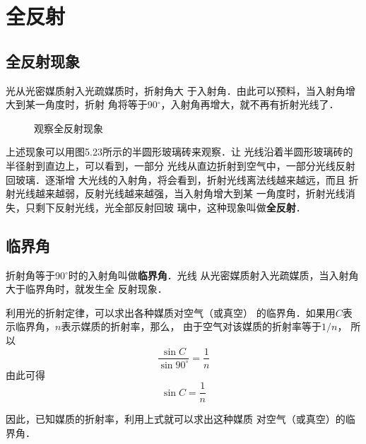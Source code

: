\section{全反射}
\subsection{全反射现象}

光从光密媒质射入光疏媒质时，折射角大
于入射角．由此可以预料，当入射角增大到某一角度时，折射
角将等于90$^\circ$，入射角再增大，就不再有折射光线了．
    \begin{figure}[htp]
        \centering
        \caption{观察全反射现象}
    \end{figure}

上述现象可以用图5.23所示的半圆形玻璃砖来观察．让
光线沿着半圆形玻璃砖的半径射到直边上，可以看到，一部分
光线从直边折射到空气中，一部分光线反射回玻璃．逐渐增
大光线的入射角，将会看到，折射光线离法线越来越远，而且
折射光线越来越弱，反射光线越来越强，当入射角增大到某
一角度时，折射光线消失，只剩下反射光线，光全部反射回玻
璃中，这种现象叫做\textbf{全反射}．

\subsection{临界角}

折射角等于90$^\circ$时的入射角叫做\textbf{临界角}．光线
从光密媒质射入光疏媒质，当入射角大于临界角时，就发生全
反射现象．

利用光的折射定律，可以求出各种媒质对空气（或真空）
的临界角．如果用$C$表示临界角，$n$表示媒质的折射率，那么，
由于空气对该媒质的折射率等于$1/n$，
所以
\[\frac{\sin C}{\sin 90^\circ}=\frac{1}{n} \]
由此可得
\[\sin C=\frac{1}{n} \]

因此，已知媒质的折射率，利用上式就可以求出这种媒质
对空气（或真空）的临界角．

